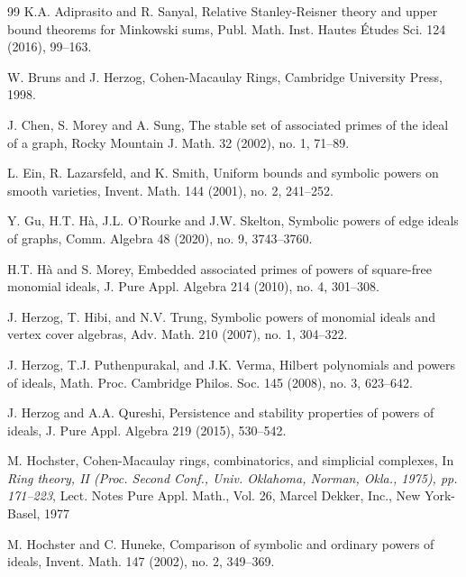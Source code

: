 \documentclass[12pt]{amsart}
\numberwithin{equation}{section}
\theoremstyle{definition}
\theoremstyle{definition}
\begin{document}
	\begin{thebibliography}{99}
		 K.A. Adiprasito and R. Sanyal,
		Relative Stanley-Reisner theory and upper bound theorems for Minkowski sums,
		Publ. Math. Inst. Hautes \'Etudes Sci. 124 (2016), 99--163.
		
		 W. Bruns and J. Herzog,
		Cohen-Macaulay Rings,
		Cambridge University Press, 1998.
		
		 J. Chen, S. Morey and A. Sung,
		The stable set of associated primes of the ideal of a graph,
		Rocky Mountain J. Math. 32 (2002), no. 1, 71--89.
		
		 L. Ein, R. Lazarsfeld, and K. Smith,
		Uniform bounds and symbolic powers on smooth varieties,
		Invent. Math. 144 (2001), no. 2, 241--252.
		
		 Y. Gu, H.T. H\`a, J.L. O'Rourke and J.W. Skelton,
		Symbolic powers of edge ideals of graphs,
		Comm. Algebra 48 (2020), no. 9, 3743--3760.
		
		 H.T. H\`a and S. Morey,
		Embedded associated primes of powers of square-free monomial ideals,
		J. Pure Appl. Algebra 214 (2010), no. 4, 301--308.
		
		
	
	J. Herzog, T. Hibi, and N.V. Trung,
	Symbolic powers of monomial ideals and vertex cover algebras,
	Adv. Math. 210 (2007), no. 1, 304--322.
		
		 J. Herzog, T.J. Puthenpurakal, and J.K. Verma,
		Hilbert polynomials and powers of ideals,
		Math. Proc. Cambridge Philos. Soc. 145 (2008), no. 3, 623--642.
		
		 J. Herzog and A.A. Qureshi,
		Persistence and stability properties of powers of ideals,
		J. Pure Appl. Algebra 219 (2015), 530--542.
		
		 M. Hochster,
		Cohen-Macaulay rings, combinatorics, and simplicial complexes,
		In \emph{Ring theory, II (Proc. Second Conf., Univ. Oklahoma, Norman, Okla., 1975), pp. 171--223},
		Lect. Notes Pure Appl. Math., Vol. 26,
		Marcel Dekker, Inc., New York-Basel, 1977
		
		 M. Hochster and C. Huneke,
		Comparison of symbolic and ordinary powers of ideals,
		Invent. Math. 147 (2002), no. 2, 349--369.
		

\end{thebibliography}
\end{document}
